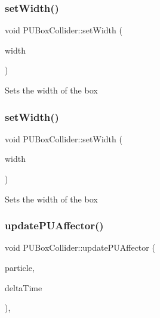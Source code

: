\subsubsection{\texorpdfstring{set\+Width()}{setWidth()}\hspace{0.1cm}{\footnotesize\ttfamily [1/2]}}
{\footnotesize\ttfamily void P\+U\+Box\+Collider\+::set\+Width (\begin{DoxyParamCaption}\item[{const float}]{width }\end{DoxyParamCaption})}

Sets the width of the box \mbox{\label{classPUBoxCollider_aad771def3e9af572efaa8133fb2ab070}} 
\subsubsection{\texorpdfstring{set\+Width()}{setWidth()}\hspace{0.1cm}{\footnotesize\ttfamily [2/2]}}
{\footnotesize\ttfamily void P\+U\+Box\+Collider\+::set\+Width (\begin{DoxyParamCaption}\item[{const float}]{width }\end{DoxyParamCaption})}

Sets the width of the box \mbox{\label{classPUBoxCollider_ae4719224dfc6368f18e40654b5411363}} 
\subsubsection{\texorpdfstring{update\+P\+U\+Affector()}{updatePUAffector()}}
{\footnotesize\ttfamily void P\+U\+Box\+Collider\+::update\+P\+U\+Affector (\begin{DoxyParamCaption}\item[{\hyperlink{structPUParticle3D}{P\+U\+Particle3D} $\ast$}]{particle,  }\item[{float}]{delta\+Time }\end{DoxyParamCaption})\hspace{0.3cm}{\ttfamily [override]}, {\ttfamily [virtual]}}


